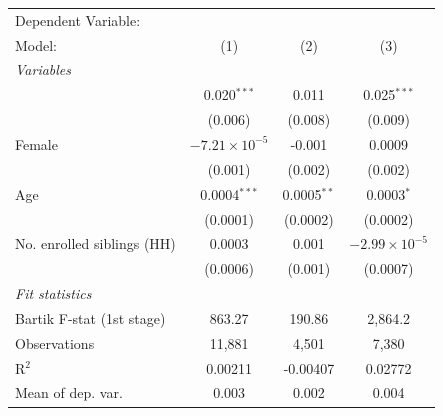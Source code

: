 \begin{tabular}{lccc}
   \tabularnewline \midrule \midrule
   Dependent Variable: & \\
   Model:                                                                & (1)                    & (2)           & (3)\\  
   \midrule
   \emph{Variables}\\
        & 0.020$^{***}$          & 0.011         & 0.025$^{***}$\\   
                                                                         & (0.006)                & (0.008)       & (0.009)\\   
   Female                                                                & $-7.21\times 10^{-5}$  & -0.001        & 0.0009\\   
                                                                         & (0.001)                & (0.002)       & (0.002)\\   
   Age                                                                   & 0.0004$^{***}$         & 0.0005$^{**}$ & 0.0003$^{*}$\\   
                                                                         & (0.0001)               & (0.0002)      & (0.0002)\\   
   No. enrolled siblings (HH)                                            & 0.0003                 & 0.001         & $-2.99\times 10^{-5}$\\    
                                                                         & (0.0006)               & (0.001)       & (0.0007)\\   
   \midrule
   \emph{Fit statistics}\\
   Bartik F-stat (1st stage)                                     & 863.27                 & 190.86        & 2,864.2\\  
   Observations                                                          & 11,881                 & 4,501         & 7,380\\  
   R$^2$                                                                 & 0.00211                & -0.00407      & 0.02772\\  
   Mean of dep. var.                                                     & 0.003                  & 0.002         & 0.004\\  
\bottomrule
\end{tabular}
